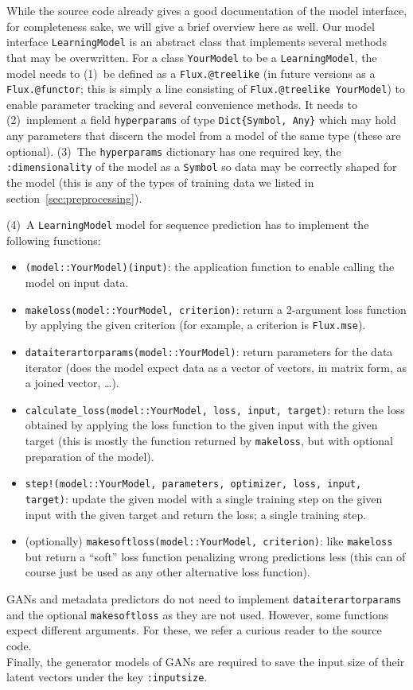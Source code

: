While the source code already gives a good documentation of the model
interface, for completeness sake, we will give a brief overview here
as well. Our model interface \texttt{LearningModel} is an abstract
class that implements several methods that may be overwritten. For a
class \texttt{YourModel} to be a \texttt{LearningModel}, the model
needs to (1)~be defined as a \texttt{Flux.@treelike} (in future
versions as a \texttt{Flux.@functor}; this is simply a line consisting
of \texttt{Flux.@treelike YourModel}) to enable parameter tracking and
several convenience methods. It needs to (2)~implement a field
\texttt{hyperparams} of type \texttt{Dict\{Symbol, Any\}} which may
hold any parameters that discern the model from a model of the same
type (these are optional). (3)~The \texttt{hyperparams} dictionary has
one required key, the \texttt{:dimensionality} of the model as a
\texttt{Symbol} so data may be correctly shaped for the model (this is
any of the types of training data we listed in
section~\ref{sec:preprocessing}).

(4)~A \texttt{LearningModel} model for sequence prediction has to
implement the following functions:
\begin{itemize}
\item \texttt{(model::YourModel)(input)}: the application function to
  enable calling the model on input data.
\item \texttt{makeloss(model::YourModel, criterion)}: return a
  2-argument loss function by applying the given criterion (for
  example, a criterion is \texttt{Flux.mse}).
\item \texttt{dataiterartorparams(model::YourModel)}: return
  parameters for the data iterator (does the model expect data as a
  vector of vectors, in matrix form, as a joined vector, \dots).
\item \texttt{calculate\_loss(model::YourModel, loss, input, target)}:
  return the loss obtained by applying the loss function to the given
  input with the given target (this is mostly the function returned by
  \texttt{makeloss}, but with optional preparation of the model).
\item \texttt{step!(model::YourModel, parameters, optimizer, loss,
    input, target)}: update the given model with a single training
  step on the given input with the given target and return the loss; a
  single training step.
\item (optionally) \texttt{makesoftloss(model::YourModel, criterion)}:
  like \texttt{makeloss} but return a ``soft'' loss function
  penalizing wrong predictions less (this can of course just be used
  as any other alternative loss function).
\end{itemize}

GANs and metadata predictors do not need to implement
\texttt{dataiterartorparams} and the optional \texttt{makesoftloss} as
they are not used. However, some functions expect different arguments.
For these, we refer a curious reader to the source code. \\
Finally, the generator models of GANs are required to save the input
size of their latent vectors under the key \texttt{:inputsize}.

